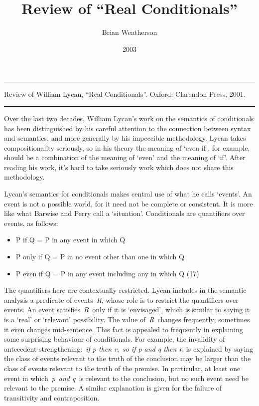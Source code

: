 \documentclass[
  10pt,
  letterpaper,
  DIV=11,
  numbers=noendperiod,
  twoside]{scrartcl}
\title{Review of ``Real Conditionals''}
\author{Brian Weatherson}
\date{2003}
\providecommand{\tightlist}{%
  \setlength{\itemsep}{0pt}\setlength{\parskip}{0pt}}\usepackage{longtable,booktabs,array}
\renewenvironment{abstract}
 {\vspace{-1.25cm}
 \quotation\small\noindent\rule{\linewidth}{.5pt}\par\smallskip
 \noindent }
 {\par\noindent\rule{\linewidth}{.5pt}\endquotation}
\begin{document}
\maketitle
\begin{abstract}
Review of William Lycan, ``Real Conditionals''. Oxford: Clarendon Press,
2001.
\end{abstract}


Over the last two decades, William Lycan's work on the semantics of
conditionals has been distinguished by his careful attention to the
connection between syntax and semantics, and more generally by his
impeccible methodology. Lycan takes compositionality seriously, so in
his theory the meaning of `even if', for example, should be a
combination of the meaning of `even' and the meaning of `if'. After
reading his work, it's hard to take seriously work which does not share
this methodology.

Lycan's semantics for conditionals makes central use of what he calls
`events'. An event is not a possible world, for it need not be complete
or consistent. It is more like what Barwise and Perry call a
`situation'. Conditionals are quantifiers over events, as follows:

\begin{itemize}
\tightlist
\item
  P if Q = P in any event in which Q
\item
  P only if Q = P in no event other than one in which Q
\item
  P even if Q = P in any event including any in which Q (17)
\end{itemize}

The quantifiers here are contextually restricted. Lycan includes in the
semantic analysis a predicate of events~\emph{R}, whose role is to
restrict the quantifiers over events. An event satisfies~\emph{R}~only
if it is `envisaged', which is similar to saying it is a `real' or
`relevant' possibility. The value of~\emph{R}~changes frequently;
sometimes it even changes mid-sentence. This fact is appealed to
frequently in explaining some surprising behaviour of conditionals. For
example, the invalidity of antecedent-strengthening:~\emph{if p then
r},~\emph{so if p and q then r}, is explained by saying the class of
events relevant to the truth of the conclusion may be larger than the
class of events relevant to the truth of the premise. In particular, at
least one event in which~\emph{p}~\emph{and q}~is relevant to the
conclusion, but no such event need be relevant to the premise. A similar
explanation is given for the failure of transitivity and contraposition.
\end{document}
